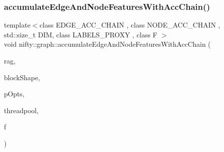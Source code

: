 \subsubsection{\texorpdfstring{accumulate\+Edge\+And\+Node\+Features\+With\+Acc\+Chain()}{accumulateEdgeAndNodeFeaturesWithAccChain()}\hspace{0.1cm}{\footnotesize\ttfamily [2/2]}}
{\footnotesize\ttfamily template$<$class E\+D\+G\+E\+\_\+\+A\+C\+C\+\_\+\+C\+H\+A\+IN , class N\+O\+D\+E\+\_\+\+A\+C\+C\+\_\+\+C\+H\+A\+IN , std\+::size\+\_\+t D\+IM, class L\+A\+B\+E\+L\+S\+\_\+\+P\+R\+O\+XY , class F $>$ \\
void nifty\+::graph\+::accumulate\+Edge\+And\+Node\+Features\+With\+Acc\+Chain (\begin{DoxyParamCaption}\item[{const \hyperlink{classnifty_1_1graph_1_1GridRag}{Grid\+Rag}$<$ D\+IM, L\+A\+B\+E\+L\+S\+\_\+\+P\+R\+O\+XY $>$ \&}]{rag,  }\item[{const \hyperlink{namespacenifty_1_1array_a683f151f19c851754e0c6d55ed16a0c2}{array\+::\+Static\+Array}$<$ int64\+\_\+t, D\+IM $>$ \&}]{block\+Shape,  }\item[{const \hyperlink{classnifty_1_1parallel_1_1ParallelOptions}{parallel\+::\+Parallel\+Options} \&}]{p\+Opts,  }\item[{\hyperlink{classnifty_1_1parallel_1_1ThreadPool}{parallel\+::\+Thread\+Pool} \&}]{threadpool,  }\item[{F \&\&}]{f }\end{DoxyParamCaption})}

\mbox{\label{namespacenifty_1_1graph_a8bba7bf00968cb611c2b01bddfe6f2fd}} 
